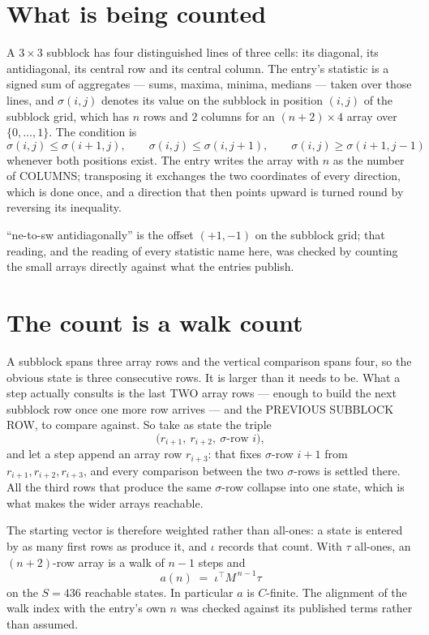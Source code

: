 \documentclass[11pt,a4paper]{article}
\theoremstyle{plain}
\theoremstyle{definition}
\begin{document}
\section{What is being counted}

A $3\times3$ subblock has four distinguished lines of three cells: its diagonal, its
antidiagonal, its central row and its central column. The entry's statistic is a signed sum of
aggregates --- sums, maxima, minima, medians --- taken over those lines, and $\sigma(i,j)$
denotes its value on the subblock in position $(i,j)$ of the subblock grid, which has $n$ rows
and $2$ columns for an $(n+2)\times4$ array over $\{0,\dots,1\}$. The condition is
\[
\sigma(i,j)\le\sigma(i+1,j),\qquad \sigma(i,j)\le\sigma(i,j+1),\qquad \sigma(i,j)\ge\sigma(i+1,j-1)
\]
whenever both positions exist. The entry writes the array with $n$ as the number of COLUMNS; transposing it exchanges the two coordinates of every direction, which is done once, and a direction that then points upward is turned round by reversing its inequality.

``ne-to-sw antidiagonally'' is the offset $(+1,-1)$ on the subblock grid; that reading, and
the reading of every statistic name here, was checked by counting the small arrays directly
against what the entries publish.

\section{The count is a walk count}

A subblock spans three array rows and the vertical comparison spans four, so the obvious state
is three consecutive rows. It is larger than it needs to be. What a step actually consults is
the last TWO array rows --- enough to build the next subblock row once one more row arrives ---
and the PREVIOUS SUBBLOCK ROW, to compare against. So take as state the triple
\[
\bigl(r_{i+1},\ r_{i+2},\ \sigma\text{-row }i\bigr),
\]
and let a step append an array row $r_{i+3}$: that fixes $\sigma$-row $i+1$ from
$r_{i+1},r_{i+2},r_{i+3}$, and every comparison between the two $\sigma$-rows is settled
there. All the third rows that produce the same $\sigma$-row collapse into one state, which is
what makes the wider arrays reachable.

The starting vector is therefore weighted rather than all-ones: a state is entered by as many
first rows as produce it, and $\iota$ records that count. With $\tau$ all-ones, an
$(n+2)$-row array is a walk of $n-1$ steps and
\[
a(n)\;=\;\iota^{\!\top}M^{\,n-1}\tau
\]
on the $S=436$ reachable states. In particular $a$ is $C$-finite. The alignment of the walk
index with the entry's own $n$ was checked against its published terms rather than assumed.
\end{document}
